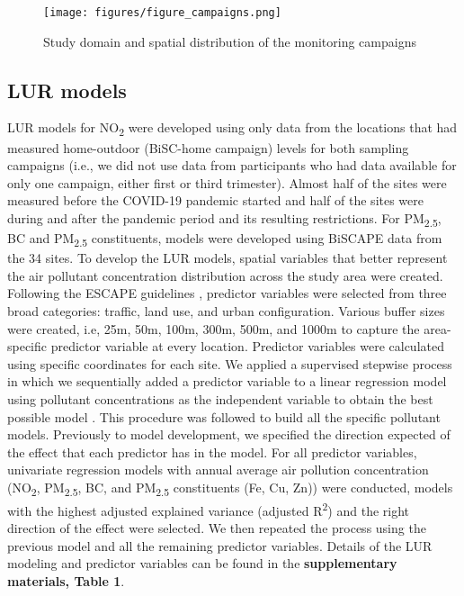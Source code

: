 \documentclass{article}
\begin{document}
\captionsetup[figure]{skip=0pt}
\begin{figure}[!htb]
\texttt{[image: figures/figure\_campaigns.png]}
\caption{Study domain and spatial distribution of the monitoring campaigns}
\label{fig1}
\end{figure}

\subsection{LUR models}

LUR models for NO\textsubscript{2} were developed using only data from the locations that had measured home-outdoor (BiSC-home campaign) levels for both sampling campaigns (i.e., we did not use data from participants who had data available for only one campaign, either first or third trimester). Almost half of the sites were measured before the COVID-19 pandemic started and half of the sites were during and after the pandemic period and its resulting restrictions. For PM\textsubscript{2.5}, BC  and PM\textsubscript{2.5} constituents, models were developed using BiSCAPE data from the 34 sites. To develop the LUR models, spatial variables that better represent the air pollutant concentration distribution across the study area were created. Following the ESCAPE guidelines \cite{ESCAPE2010, eeftens2012, beelen2013},  predictor variables were selected from three broad categories: traffic, land use, and urban configuration. Various buffer sizes were created, i.e, 25m, 50m, 100m, 300m, 500m, and 1000m to capture the area-specific predictor variable at every location. Predictor variables were calculated using specific coordinates for each site. We applied a supervised stepwise process in which we sequentially added a predictor variable to a linear regression model using pollutant concentrations as the independent variable to obtain the best possible model \cite{eeftens2012, beelen2013}. This procedure was followed to build all the specific pollutant models. Previously to model development, we specified the direction expected of the effect that each predictor has in the model. For all predictor variables, univariate regression models with annual average air pollution concentration (NO\textsubscript{2}, PM\textsubscript{2.5}, BC, and PM\textsubscript{2.5} constituents (Fe, Cu, Zn)) were conducted, models with the highest adjusted explained variance (adjusted R\textsuperscript{2}) and the right direction of the effect were selected. We then repeated the process using the previous model and all the remaining predictor variables. Details of the LUR modeling and predictor variables can be found in the \textbf{supplementary materials, Table 1}.
\end{document}
